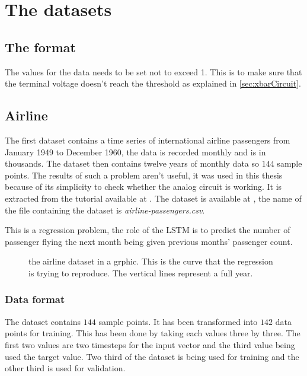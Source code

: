 \section{The datasets}\label{sec:dataset}

\subsection{The format}

The values for the data needs to be set not to exceed 1. This is to make sure that the terminal voltage doesn't reach the threshold as explained in \cref{sec:xbarCircuit}.

\subsection{Airline}

The first dataset contains a time series of international airline passengers from January 1949 to December 1960, the data is recorded monthly and is in thousands. The dataset then contains twelve years of monthly data so $144$ sample points. The results of such a problem aren't useful, it was used in this thesis because of its simplicity to check whether the analog circuit is working. It is extracted from the tutorial available at \cite{airline}. The dataset is available at \cite{datasets}, the name of the file containing the dataset is \textit{airline-passengers.csv}.

This is a regression problem, the role of the \ac{LSTM} is to predict the number of passenger flying the next month being given previous months' passenger count.

\begin{figure}[H]
  \centering
  
  \caption{the airline dataset in a grphic. This is the curve that the regression is trying to reproduce. The vertical lines represent a full year.}
  \label{graph:airline}
\end{figure}

\subsubsection{Data format}

The dataset contains $144$ sample points. It has been transformed into $142$ data points for training. This has been done by taking each values three by three. The first two values are two timesteps for the input vector and the third value being used the target value. Two third of the dataset is being used for training and the other third is used for validation.

